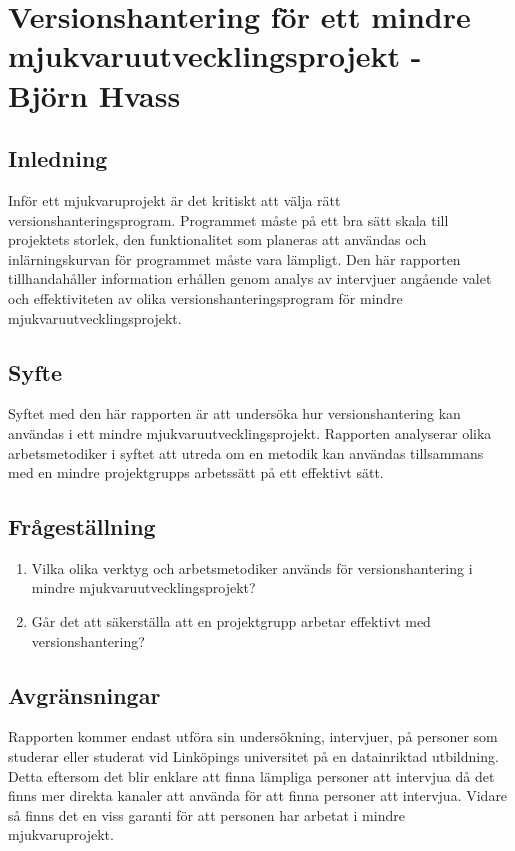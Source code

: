 \chapter{Versionshantering för ett mindre mjukvaruutvecklingsprojekt - Björn Hvass}


%
%
%
%
%
%
%
%
%
%
%

\vspace{3em}
\section{Inledning}
Inför ett mjukvaruprojekt är det kritiskt att välja rätt versionshanteringsprogram. Programmet måste på ett bra sätt skala till projektets storlek, den funktionalitet som planeras att användas och inlärningskurvan för programmet måste vara lämpligt. Den här rapporten tillhandahåller information erhållen genom analys av intervjuer angående valet och effektiviteten av olika versionshanteringsprogram för mindre mjukvaruutvecklingsprojekt.

\section{Syfte}
Syftet med den här rapporten är att undersöka hur versionshantering kan användas i ett mindre mjukvaruutvecklingsprojekt. Rapporten analyserar olika arbetsmetodiker i syftet att utreda om en metodik kan användas tillsammans med en mindre projektgrupps arbetssätt på ett effektivt sätt.

\section{Frågeställning}
\begin{enumerate}
    \item Vilka olika verktyg och arbetsmetodiker används för versionshantering i mindre mjukvaruutvecklingsprojekt?
    \item Går det att säkerställa att en projektgrupp arbetar effektivt med versionshantering?
\end{enumerate}

\section{Avgränsningar}
Rapporten kommer endast utföra sin undersökning, intervjuer, på personer som studerar eller studerat vid Linköpings universitet på en datainriktad utbildning. Detta eftersom det blir enklare att finna lämpliga personer att intervjua då det finns mer direkta kanaler att använda för att finna personer att intervjua. Vidare så finns det en viss garanti för att personen har arbetat i mindre mjukvaruprojekt.

